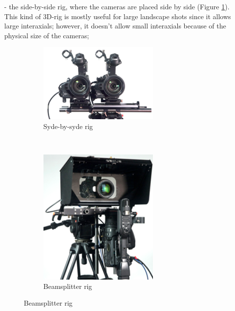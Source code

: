 \begin{itemize}
\item[-] the side-by-side rig, where the cameras are placed side by side (Figure \ref{fig:sbs}). This kind of 3D-rig is mostly useful for large landscape shots since it allows large interaxials; however, it doesn't allow small interaxials because of the physical size of the cameras;
\begin{figure}[h!]
\centering
\begin{subfigure}[]{0.4\textwidth}
\centering
\includegraphics[width=0.7\textwidth]{./img/syderig.png}
\caption{\scriptsize{Syde-by-syde rig}}
\label{fig:sbs}
\end{subfigure}%
~ %
\begin{subfigure}[]{0.25\textwidth}
\centering
\includegraphics[width=0.7\textwidth]{./img/mirrorrig.png}
\caption{\scriptsize{Beamsplitter rig}}

\end{subfigure}
\end{figure}
\end{itemize}
